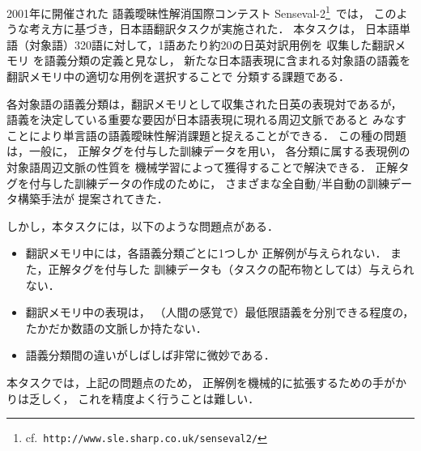 2001年に開催された
語義曖昧性解消国際コンテスト {\sc Senseval}-2\footnote{
cf.\ {\tt http://www.sle.sharp.co.uk/senseval2/}
}\
では，
このような考え方に基づき，日本語翻訳タスクが実施された．
本タスクは，
日本語単語（対象語）320語に対して，1語あたり約20の日英対訳用例を
収集した翻訳メモリ
を語義分類の定義と見なし，
新たな日本語表現に含まれる対象語の語義を
翻訳メモリ中の適切な用例を選択することで
分類する課題である\cite{kurohashi:01a}．

各対象語の語義分類は，翻訳メモリとして収集された日英の表現対であるが，
語義を決定している重要な要因が日本語表現に現れる周辺文脈であると
みなすことにより単言語の語義曖昧性解消課題と捉えることができる．
この種の問題は，一般に，
正解タグを付与した訓練データを用い，
各分類に属する表現例の対象語周辺文脈の性質を
機械学習によって獲得することで解決できる．
正解タグを付与した訓練データの作成のために，
さまざまな全自動/半自動の訓練データ構築手法が
提案されてきた\cite{dagan:94,yarowsky:95,karov:98}．

しかし，本タスクには，以下のような問題点がある．
\begin{itemize}
 \item 翻訳メモリ中には，各語義分類ごとに1つしか
       正解例が与えられない．
       また，正解タグを付与した
       訓練データも（タスクの配布物としては）与えられない．
 \item 翻訳メモリ中の表現は，
       （人間の感覚で）最低限語義を分別できる程度の，
       たかだか数語の文脈しか持たない．
 \item 語義分類間の違いがしばしば非常に微妙である．
\end{itemize}
本タスクでは，上記の問題点のため，
正解例を機械的に拡張するための手がかりは乏しく，
これを精度よく行うことは難しい．

